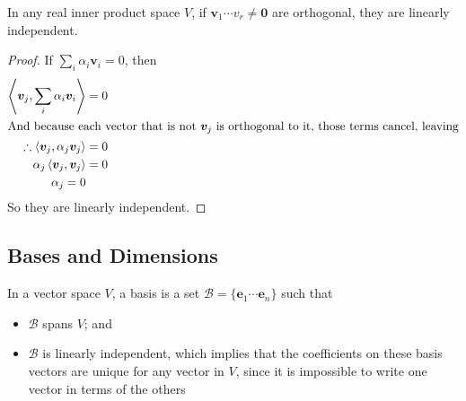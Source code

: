 \documentclass{article}
\begin{document}
\begin{lemma}
	In any real inner product space $V$, if $\bm v_1 \cdots v_r \neq \bm 0$ are orthogonal, they are linearly independent.
\end{lemma}
\begin{proof}
	If $\sum_i \alpha_i \bm v_i = 0$, then
	\begin{align*}
		\left\langle \bm v_j, \sum_i \alpha_i \bm v_i \right\rangle     & = 0 \\
		\intertext{And because each vector that is not $\bm v_j$ is orthogonal to it, those terms cancel, leaving}
		\therefore \left\langle \bm v_j, \alpha_j \bm v_j \right\rangle & = 0 \\
		\alpha_j \left\langle \bm v_j, \bm v_j \right\rangle            & = 0 \\
		\alpha_j = 0
	\end{align*}
	So they are linearly independent.
\end{proof}

\subsection{Bases and Dimensions}
In a vector space $V$, a basis is a set $\mathcal B = \{ \bm e_1 \cdots \bm e_n \}$ such that
\begin{itemize}
	\item $\mathcal B$ spans $V$; and
	\item $\mathcal B$ is linearly independent, which implies that the coefficients on these basis vectors are unique for any vector in $V$, since it is impossible to write one vector in terms of the others
\end{itemize}
\end{document}
